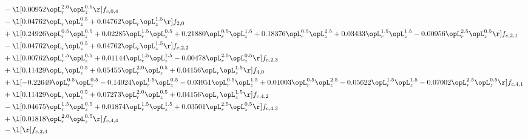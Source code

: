 \begin{alignat}{2}
& - \l[  0.00952 \opL_r^{2.0} \opL_z^{0.5}  \r] f_{c,0,4} \nonumber \\ 
& - \l[  0.04762 \opL_r \opL_z^{0.5} +  0.04762 \opL_r \opL_z^{1.5}  \r] f_{2,0} \nonumber \\ 
& + \l[  0.24926 \opL_r^{0.5} \opL_z^{0.5} +  0.02285 \opL_r^{1.5} \opL_z^{0.5} +  0.21880 \opL_r^{0.5} \opL_z^{1.5} +  0.18376 \opL_r^{0.5} \opL_z^{2.5} +  0.03433 \opL_r^{1.5} \opL_z^{1.5}   -0.00956 \opL_r^{2.5} \opL_z^{0.5}  \r] f_{c,2,1} \nonumber \\ 
& - \l[  0.04762 \opL_r \opL_z^{0.5} +  0.04762 \opL_r \opL_z^{1.5}  \r] f_{c,2,2} \nonumber \\ 
& + \l[  0.00762 \opL_r^{1.5} \opL_z^{0.5} +  0.01144 \opL_r^{1.5} \opL_z^{1.5}   -0.00478 \opL_r^{2.5} \opL_z^{0.5}  \r] f_{c,2,3} \nonumber \\ 
& + \l[  0.11429 \opL_r \opL_z^{0.5} +  0.05455 \opL_r^{2.0} \opL_z^{0.5} +  0.04156 \opL_r \opL_z^{1.5}  \r] f_{4,0} \nonumber \\ 
& + \l[  -0.22649 \opL_r^{0.5} \opL_z^{0.5}   -0.14024 \opL_r^{1.5} \opL_z^{0.5}   -0.03951 \opL_r^{0.5} \opL_z^{1.5} +  0.01003 \opL_r^{0.5} \opL_z^{2.5}   -0.05622 \opL_r^{1.5} \opL_z^{1.5}   -0.07002 \opL_r^{2.5} \opL_z^{0.5}  \r] f_{c,4,1} \nonumber \\ 
& + \l[  0.11429 \opL_r \opL_z^{0.5} +  0.07273 \opL_r^{2.0} \opL_z^{0.5} +  0.04156 \opL_r \opL_z^{1.5}  \r] f_{c,4,2} \nonumber \\ 
& - \l[  0.04675 \opL_r^{1.5} \opL_z^{0.5} +  0.01874 \opL_r^{1.5} \opL_z^{1.5} +  0.03501 \opL_r^{2.5} \opL_z^{0.5}  \r] f_{c,4,3} \nonumber \\ 
& + \l[  0.01818 \opL_r^{2.0} \opL_z^{0.5}  \r] f_{c,4,4} \nonumber \\ 
& - \l[  \r] f_{c,2,4} \nonumber \\ 
\end{alignat} 


